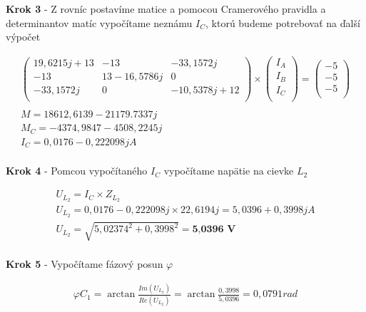 \begin{center}
    \textbf{Krok 3} - Z rovníc postavíme matice a pomocou Cramerového pravidla a determinantov matíc vypočítame neznámu  $I_C$, ktorú budeme potrebovať na ďalší výpočet
\end{center}

\begin{gather*}
	\begin{pmatrix}
		19,6215j+13 & -13 & -33,1572j \\
		-13 & 13-16,5786j  & 0 \\
		-33,1572j & 0 & -10,5378j+12\\
	\end{pmatrix}
	\times
	\begin{pmatrix}
		I_A \\
		I_B \\
		I_C \\
	\end{pmatrix}
	=
	\begin{pmatrix}
		-5 \\
		-5 \\
		-5 \\
	\end{pmatrix} \\
	\\
	M = 18612,6139-21179.7337j \\
	M_C = -4374,9847-4508,2245j \\
	I_C = 0,0176-0,222098j A \\
\end{gather*}

\begin{center}
    \textbf{Krok 4} - Pomcou vypočítaného $I_C$ vypočítame napätie na cievke $L_2$
\end{center}

\begin{gather*}
U_{L_2} = I_C \times Z_{L_2} \\
U_{L_2} =  0,0176-0,222098j \times   22,6194j = 5,0396 + 0,3998j A \\
U_{L_2} = \sqrt{5,02374^2 + 0,3998^2} = \textbf{5,0396 V} \\
\end{gather*}

\begin{center}
    \textbf{Krok 5} - Vypočítame fázový posun $\varphi$
\end{center}

\begin{gather*}
\varphi C_1 = \arctan{\frac{Im(U_{L_2})}{Re(U_{L_{2}})}} =\arctan{\frac{0,3998}{5,0396}} = 0,0791 rad \\ 
\end{gather*}


